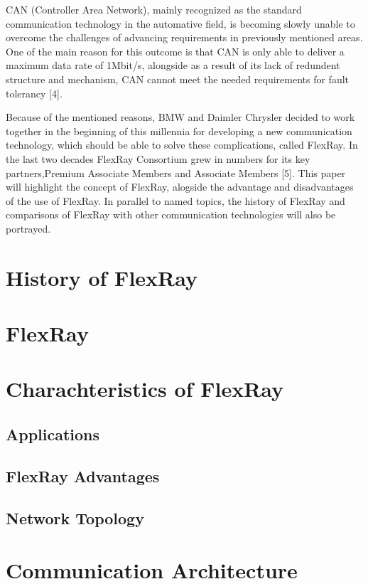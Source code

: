 \documentclass[conference]{IEEEtran}
\begin{document}
CAN (Controller Area Network), mainly recognized as the standard communication technology in the automative field, is becoming slowly unable to overcome the challenges of advancing requirements in previously mentioned areas. One of the main reason for this outcome is that CAN is only able to deliver a maximum data rate of 1Mbit/s, alongside as a result of its lack of redundent structure and mechanism, CAN cannot meet the needed requirements for fault tolerancy [4].

Because of the mentioned reasons, BMW and Daimler Chrysler decided to work together in the beginning of this millennia for developing a new communication technology, which should be able to solve these complications, called FlexRay. In the last two decades FlexRay Consortium grew in numbers for its key partners,Premium Associate Members and Associate Members [5]. This paper will highlight the concept of FlexRay, alogside the advantage and disadvantages of the use of FlexRay. In parallel to named topics, the history of FlexRay and comparisons of FlexRay with other communication technologies will also be portrayed.


\section{History of FlexRay}

\section{FlexRay}

\section{Charachteristics of FlexRay}


\subsection{Applications}


\subsection{FlexRay Advantages}

\subsection{Network Topology}

\section{Communication Architecture}
\end{document}
